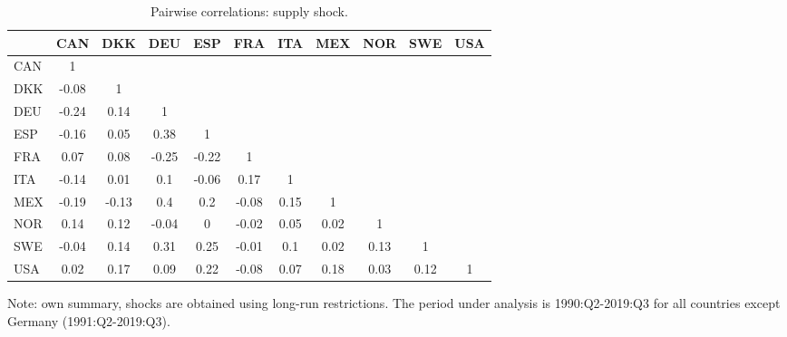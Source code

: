 \documentclass[12pt, a4paper]{article}
\begin{document}
\begin{table}[H]
\captionsetup{justification=raggedright,
singlelinecheck=false
}
    \centering
    \caption{Pairwise correlations: supply shock.}  
    \begin{tabular}{l ccc ccc ccc c}
    \toprule
 & CAN & DKK & DEU & ESP & FRA & ITA & MEX & NOR & SWE & USA \\ 
  \hline
  CAN & 1 &  &  &  &  &  &  &  &  &  \\ 
  DKK & -0.08 & 1 &  &  &  &  &  &  &  &  \\ 
  DEU & -0.24 & 0.14 & 1 &  &  &  &  &  &  &  \\ 
  ESP & -0.16 & 0.05 & 0.38 & 1 &  &  &  &  &  &  \\ 
  FRA & 0.07 & 0.08 & -0.25 & -0.22 & 1 &  &  &  &  &  \\ 
  ITA & -0.14 & 0.01 & 0.1 & -0.06 & 0.17 & 1 &  &  &  &  \\ 
  MEX & -0.19 & -0.13 & 0.4 & 0.2 & -0.08 & 0.15 & 1 &  &  &  \\ 
  NOR & 0.14 & 0.12 & -0.04 & 0 & -0.02 & 0.05 & 0.02 & 1 &  &  \\ 
  SWE & -0.04 & 0.14 & 0.31 & 0.25 & -0.01 & 0.1 & 0.02 & 0.13 & 1 &  \\ 
  USA & 0.02 & 0.17 & 0.09 & 0.22 & -0.08 & 0.07 & 0.18 & 0.03 & 0.12 & 1 \\ 
  \bottomrule
    \end{tabular}
    \begin{minipage}{\textwidth}
    \vspace{0.1cm} 
    \footnotesize Note: own summary, shocks are obtained using long-run restrictions. The period under analysis is 1990:Q2-2019:Q3 for all countries except Germany (1991:Q2-2019:Q3).
    \end{minipage}
    \label{table:a2}
\end{table}

\end{document}
